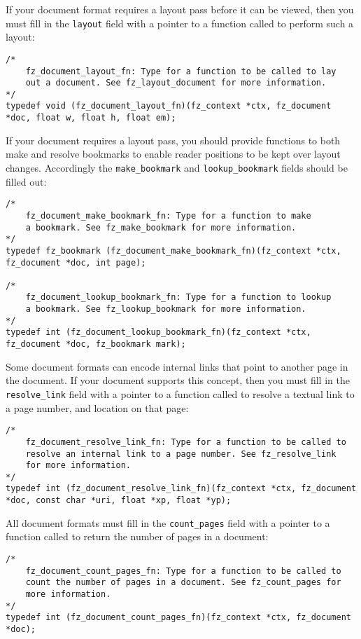 \documentclass[oneside]{book}
\begin{document}
If your document format requires a layout pass before it can be viewed, then you must fill in the \texttt{layout} field with a pointer to a function called to perform such a layout:

\begin{lstlisting}
/*
	fz_document_layout_fn: Type for a function to be called to lay
	out a document. See fz_layout_document for more information.
*/
typedef void (fz_document_layout_fn)(fz_context *ctx, fz_document *doc, float w, float h, float em);
\end{lstlisting}

If your document requires a layout pass, you should provide functions to both make and resolve bookmarks to enable reader positions to be kept over layout changes. Accordingly the \texttt{make\_bookmark} and \texttt{lookup\_bookmark} fields should be filled out:

\begin{lstlisting}
/*
	fz_document_make_bookmark_fn: Type for a function to make
	a bookmark. See fz_make_bookmark for more information.
*/
typedef fz_bookmark (fz_document_make_bookmark_fn)(fz_context *ctx, fz_document *doc, int page);

/*
	fz_document_lookup_bookmark_fn: Type for a function to lookup
	a bookmark. See fz_lookup_bookmark for more information.
*/
typedef int (fz_document_lookup_bookmark_fn)(fz_context *ctx, fz_document *doc, fz_bookmark mark);
\end{lstlisting}

Some document formats can encode internal links that point to another page in the document. If your document supports this concept, then you must fill in the \texttt{resolve\_link} field with a pointer to a function called to resolve a textual link to a page number, and location on that page:

\begin{lstlisting}
/*
	fz_document_resolve_link_fn: Type for a function to be called to
	resolve an internal link to a page number. See fz_resolve_link
	for more information.
*/
typedef int (fz_document_resolve_link_fn)(fz_context *ctx, fz_document *doc, const char *uri, float *xp, float *yp);
\end{lstlisting}

All document formats must fill in the \texttt{count\_pages} field with a pointer to a function called to return the number of pages in a document:

\begin{lstlisting}
/*
	fz_document_count_pages_fn: Type for a function to be called to
	count the number of pages in a document. See fz_count_pages for
	more information.
*/
typedef int (fz_document_count_pages_fn)(fz_context *ctx, fz_document *doc);
\end{lstlisting}
\end{document}
